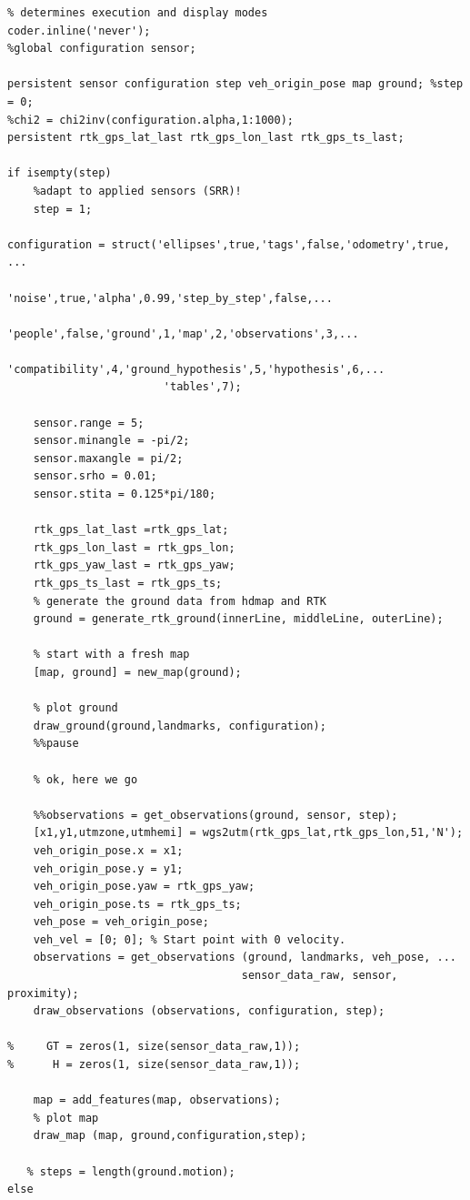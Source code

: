 \documentclass[12pt,a4paper]{article}
\begin{document}
{{{\begin{verbatim}
% determines execution and display modes
coder.inline('never');
%global configuration sensor;

persistent sensor configuration step veh_origin_pose map ground; %step = 0;
%chi2 = chi2inv(configuration.alpha,1:1000);
persistent rtk_gps_lat_last rtk_gps_lon_last rtk_gps_ts_last;

if isempty(step)
    %adapt to applied sensors (SRR)!
    step = 1;

configuration = struct('ellipses',true,'tags',false,'odometry',true, ...
                        'noise',true,'alpha',0.99,'step_by_step',false,...
                        'people',false,'ground',1,'map',2,'observations',3,...
                        'compatibility',4,'ground_hypothesis',5,'hypothesis',6,...
                        'tables',7);
                    
    sensor.range = 5;
    sensor.minangle = -pi/2;
    sensor.maxangle = pi/2;
    sensor.srho = 0.01;
    sensor.stita = 0.125*pi/180;

    rtk_gps_lat_last =rtk_gps_lat;
    rtk_gps_lon_last = rtk_gps_lon;
    rtk_gps_yaw_last = rtk_gps_yaw;
    rtk_gps_ts_last = rtk_gps_ts;     
    % generate the ground data from hdmap and RTK
    ground = generate_rtk_ground(innerLine, middleLine, outerLine);

    % start with a fresh map
    [map, ground] = new_map(ground);

    % plot ground
    draw_ground(ground,landmarks, configuration);
    %%pause

    % ok, here we go

    %%observations = get_observations(ground, sensor, step);
    [x1,y1,utmzone,utmhemi] = wgs2utm(rtk_gps_lat,rtk_gps_lon,51,'N');
    veh_origin_pose.x = x1;
    veh_origin_pose.y = y1;
    veh_origin_pose.yaw = rtk_gps_yaw;
    veh_origin_pose.ts = rtk_gps_ts;
    veh_pose = veh_origin_pose;
    veh_vel = [0; 0]; % Start point with 0 velocity.
    observations = get_observations (ground, landmarks, veh_pose, ...
                                    sensor_data_raw, sensor, proximity);
    draw_observations (observations, configuration, step);
    
%     GT = zeros(1, size(sensor_data_raw,1));
%      H = zeros(1, size(sensor_data_raw,1));
    
    map = add_features(map, observations);
    % plot map
    draw_map (map, ground,configuration,step);

   % steps = length(ground.motion);
else


\end{verbatim}}}}
\end{document}
